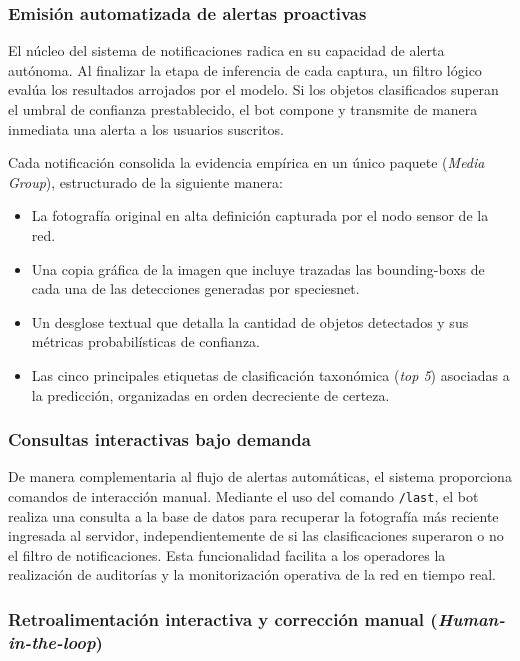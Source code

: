 \documentclass[a4paper, 12pt]{report}
\begin{document}
\subsubsection{Emisión automatizada de alertas proactivas}

El núcleo del sistema de notificaciones radica en su capacidad de alerta autónoma. Al finalizar la etapa de inferencia de cada captura, un filtro lógico evalúa los resultados arrojados por el modelo. Si los objetos clasificados superan el umbral de confianza prestablecido, el bot compone y transmite de manera inmediata una alerta a los usuarios suscritos.

Cada notificación consolida la evidencia empírica en un único paquete (\textit{Media Group}), estructurado de la siguiente manera:

\begin{itemize}
  \item La fotografía original en alta definición capturada por el nodo sensor de la red.
  \item Una copia gráfica de la imagen que incluye trazadas las \glspl{bounding-box} de cada una de las detecciones generadas por \gls{speciesnet}.
  \item Un desglose textual que detalla la cantidad de objetos detectados y sus métricas probabilísticas de confianza.
  \item Las cinco principales etiquetas de clasificación taxonómica (\textit{top 5}) asociadas a la predicción, organizadas en orden decreciente de certeza.
\end{itemize}

\subsubsection{Consultas interactivas bajo demanda}

De manera complementaria al flujo de alertas automáticas, el sistema proporciona comandos de interacción manual. Mediante el uso del comando \texttt{/last}, el bot realiza una consulta a la base de datos para recuperar la fotografía más reciente ingresada al servidor, independientemente de si las clasificaciones superaron o no el filtro de notificaciones. Esta funcionalidad facilita a los operadores la realización de auditorías y la monitorización operativa de la red en tiempo real.

\subsubsection{Retroalimentación interactiva y corrección manual (\textit{Human-in-the-loop})}
\end{document}
